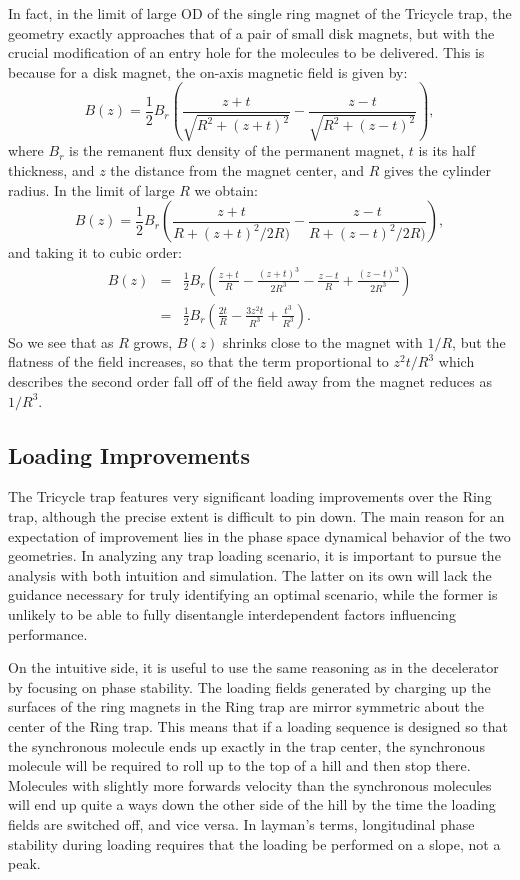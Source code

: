 \documentclass[defaultstyle,11pt]{thesis}
\begin{document}
In fact, in the limit of large OD of the single ring magnet of the Tricycle trap, the geometry exactly approaches that of a pair of small disk magnets, but with the crucial modification of an entry hole for the molecules to be delivered.
This is because for a disk magnet, the on-axis magnetic field is given by:
\begin{equation}
B(z) = \frac{1}{2}B_r\left(\frac{z+t}{\sqrt{R^2+(z+t)^2}} - \frac{z-t}{\sqrt{R^2+(z-t)^2}}    \right),
\end{equation}
where $B_r$ is the remanent flux density of the permanent magnet, $t$ is its half thickness, and $z$ the distance from the magnet center, and $R$ gives the cylinder radius. In the limit of large $R$ we obtain:
\begin{equation}
B(z) = \frac{1}{2}B_r\left( \frac{z+t}{R+(z+t)^2/2R)}  - \frac{z-t}{R+(z-t)^2/2R)}   \right),
\end{equation}
and taking it to cubic order:
\begin{eqnarray}
B(z) &=& \frac{1}{2}B_r\left( \frac{z+t}{R} - \frac{(z+t)^3}{2R^3}  - \frac{z-t}{R} + \frac{(z-t)^3}{2R^3}   \right)\\
&=& \frac{1}{2}B_r\left(\frac{2t}{R} - \frac{3z^2t}{R^3} + \frac{t^3}{R^3} \right).
\end{eqnarray} 
So we see that as $R$ grows, $B(z)$ shrinks close to the magnet with $1/R$, but the flatness of the field increases, so that the term proportional to $z^2t/R^3$ which describes the second order fall off of the field away from the magnet reduces as $1/R^3$.

\subsection{Loading Improvements}

The Tricycle trap features very significant loading improvements over the Ring trap, although the precise extent is difficult to pin down. 
The main reason for an expectation of improvement lies in the phase space dynamical behavior of the two geometries.
In analyzing any trap loading scenario, it is important to pursue the analysis with both intuition and simulation.
The latter on its own will lack the guidance necessary for truly identifying an optimal scenario, while the former is unlikely to be able to fully disentangle interdependent factors influencing performance.

On the intuitive side, it is useful to use the same reasoning as in the decelerator by focusing on phase stability.
The loading fields generated by charging up the surfaces of the ring magnets in the Ring trap are mirror symmetric about the center of the Ring trap.
This means that if a loading sequence is designed so that the synchronous molecule ends up exactly in the trap center, the synchronous molecule will be required to roll up to the top of a hill and then stop there. 
Molecules with slightly more forwards velocity than the synchronous molecules will end up quite a ways down the other side of the hill by the time the loading fields are switched off, and vice versa.
In layman's terms, longitudinal phase stability during loading requires that the loading be performed on a slope, not a peak.
\end{document}
